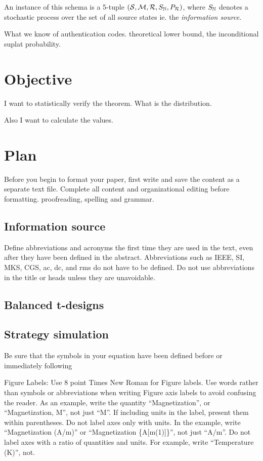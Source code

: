 \documentclass[conference]{IEEEtran}
\begin{document}
An instance of this schema is a 5-tuple $\left( \mathcal S,\mathcal M,\mathcal R,S_\mathbb{N}, P_\mathcal R \right)$, where $S_\mathbb{N}$ denotes a stochastic process over the set of all source states ie. the \textit{information source}.

What we know of authentication codes. theoretical lower bound, the inconditional suplat probability.

%
%
\section{Objective}
I want to statistically verify the theorem. What is the distribution.

Also I want to calculate the values.

%
%
\section{Plan}
Before you begin to format your paper, first write and save the content as a
separate text file. Complete all content and organizational editing before
formatting.
proofreading, spelling and grammar.

\subsection{Information source}\label{AA}
Define abbreviations and acronyms the first time they are used in the text,
even after they have been defined in the abstract. Abbreviations such as
IEEE, SI, MKS, CGS, ac, dc, and rms do not have to be defined. Do not use
abbreviations in the title or heads unless they are unavoidable.

\subsection{Balanced t-designs}

\subsection{Strategy simulation}

Be sure that the
symbols in your equation have been defined before or immediately following


Figure Labels: Use 8 point Times New Roman for Figure labels. Use words
rather than symbols or abbreviations when writing Figure axis labels to
avoid confusing the reader. As an example, write the quantity
``Magnetization'', or ``Magnetization, M'', not just ``M''. If including
units in the label, present them within parentheses. Do not label axes only
with units. In the example, write ``Magnetization (A/m)'' or ``Magnetization
\{A[m(1)]\}'', not just ``A/m''. Do not label axes with a ratio of
quantities and units. For example, write ``Temperature (K)'', not.
\end{document}
